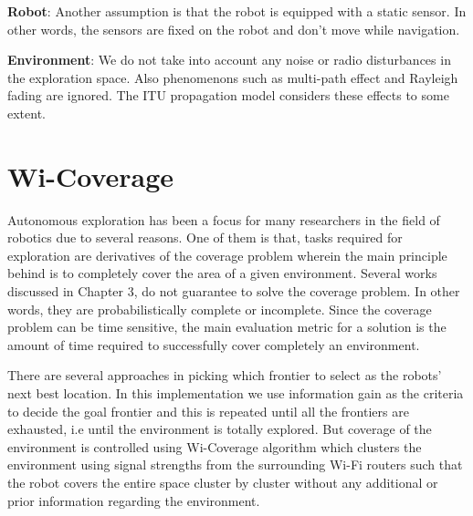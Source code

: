 \textbf{Robot}: Another assumption is that the robot is equipped with a static sensor. In other words, the sensors are fixed on the robot and don't move while navigation.

\textbf{Environment}: We do not take into account any noise or radio disturbances in the exploration space. Also phenomenons such as multi-path effect and Rayleigh fading are ignored. The ITU propagation model considers these effects to some extent. 

\section{Wi-Coverage}
Autonomous exploration has been a focus for many researchers in the field of robotics due to several reasons. One of them is that, tasks required for exploration are derivatives of the coverage problem wherein the main principle behind is to completely cover the area of a given environment. Several works discussed in Chapter 3, do not guarantee to solve the coverage problem. In other words, they are probabilistically complete or incomplete. Since the coverage problem can be time sensitive, the main evaluation metric for a solution is the amount of time required to successfully cover completely an environment.
\par There are several approaches in picking which frontier to select as the robots' next best location. In this implementation we use information gain as the criteria to decide the goal frontier and this is repeated until all the frontiers are exhausted, i.e until the environment is totally explored. But coverage of the environment is controlled using Wi-Coverage algorithm which clusters the environment using signal strengths from the surrounding Wi-Fi routers such that the robot covers the entire space cluster by cluster without any additional or prior information regarding the environment.

